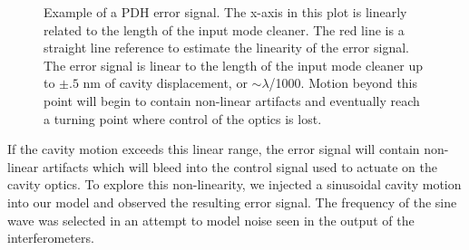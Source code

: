 \begin{figure}[h!]
\centering

\caption[Example of a PDH error signal]{Example of a PDH error signal. %
         The x-axis in this plot is linearly related to the length of the %
         input mode cleaner. 
         The red line is a straight line reference to estimate the linearity %
         of the error signal. %
         The error signal is linear to the length of the %
         input mode cleaner up to $\pm.5$ nm of cavity displacement, or %
         $\sim\lambda$/1000. Motion %
         beyond this point will begin to contain non-linear artifacts and %
         eventually reach a turning point where control of the optics is lost.}
\label{fig:pdh}
\end{figure}

If the cavity motion exceeds this linear range, the error signal will 
contain non-linear artifacts which will bleed into the control signal 
used to actuate on the cavity optics.
To explore this non-linearity, we injected a sinusoidal cavity motion into our 
model and observed the resulting error signal.
The frequency of the sine wave was selected in an attempt to model 
noise seen in the output of the interferometers.  

